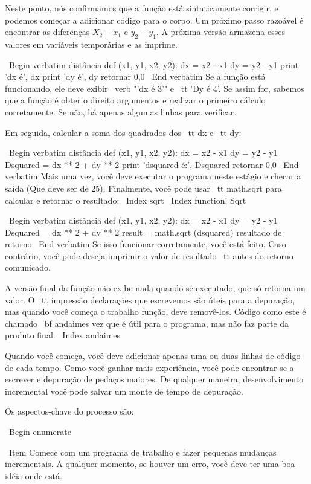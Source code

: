 \documentclass[10pt]{book}
\begin{document}
\begin {itemize}
{{{{Neste ponto, nós confirmamos que a função está sintaticamente
corrigir, e podemos começar a adicionar código para o corpo.
Um próximo passo razoável é encontrar as diferenças
$ X_2 - x_1 $ e $ y_2 - y_1 $. A próxima versão armazena esses valores em
variáveis ​​temporárias e as imprime.

\ Begin {verbatim}
distância def (x1, y1, x2, y2):
    dx = x2 - x1
    dy = y2 - y1
    print 'dx é', dx
    print 'dy é', dy
    retornar 0,0
\ End {verbatim}
%
Se a função está funcionando, ele deve exibir \ verb "'dx é 3'" e {\ tt
'Dy é 4'}. Se assim for, sabemos que a função é obter o direito
argumentos e realizar o primeiro cálculo corretamente. Se não,
há apenas algumas linhas para verificar.

Em seguida, calcular a soma dos quadrados dos {\ tt dx} e {\ tt dy}:

\ Begin {verbatim}
distância def (x1, y1, x2, y2):
    dx = x2 - x1
    dy = y2 - y1
    Dsquared = dx ** 2 + dy ** 2
    print 'dsquared é:', Dsquared
    retornar 0,0
\ End {verbatim}
%
Mais uma vez, você deve executar o programa neste estágio e checar a saída
(Que deve ser de 25).
Finalmente, você pode usar {\ tt math.sqrt} para calcular e retornar o resultado:
\ Index {sqrt}
\ Index {function! Sqrt}

\ Begin {verbatim}
distância def (x1, y1, x2, y2):
    dx = x2 - x1
    dy = y2 - y1
    Dsquared = dx ** 2 + dy ** 2
    result = math.sqrt (dsquared)
    resultado de retorno
\ End {verbatim}
%
Se isso funcionar corretamente, você está feito. Caso contrário, você pode
deseja imprimir o valor de {resultado \ tt} antes do retorno
comunicado.

A versão final da função não exibe nada quando se
executado, que só retorna um valor. O {\ tt impressão} declarações que escrevemos
são úteis para a depuração, mas quando você começa o trabalho função,
deve removê-los. Código como este é chamado {\ bf andaimes}
vez que é útil para o programa, mas não faz parte da
produto final.
\ Index {} andaimes

Quando você começa, você deve adicionar apenas uma ou duas linhas de código de cada
tempo. Como você ganhar mais experiência, você pode encontrar-se a escrever
e depuração de pedaços maiores. De qualquer maneira, desenvolvimento incremental
você pode salvar um monte de tempo de depuração.

Os aspectos-chave do processo são:

\ Begin {enumerate}

\ Item Comece com um programa de trabalho e fazer pequenas mudanças incrementais. 
A qualquer momento, se houver um erro, você deve ter uma boa idéia
onde está.

}}}}
\end{itemize}
\end{document}
